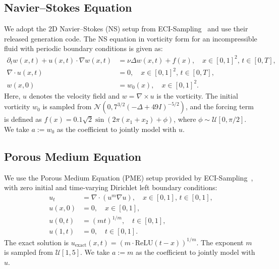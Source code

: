 \documentclass{article}
\theoremstyle{plain}
\theoremstyle{definition}
\theoremstyle{remark}
\begin{document}
\subsection{Navier--Stokes Equation}
We adopt the 2D Navier--Stokes (NS) setup from ECI-Sampling~\cite{cheng2025eci} and use their released generation code. The NS equation in vorticity form for an incompressible fluid with periodic boundary conditions is given as:
\begin{align*}
\partial_t w(x,t) + u(x,t) \cdot \nabla w(x,t) &= \nu \Delta w(x,t) + f(x), \quad x \in [0,1]^2, \, t \in [0,T], \\
\nabla \cdot u(x,t) &= 0, \quad x \in [0,1]^2, \, t \in [0,T], \\
w(x,0) &= w_0(x), \quad x \in [0,1]^2.
\end{align*}
Here, $u$ denotes the velocity field and $w = \nabla \times u$ is the vorticity. The initial vorticity $w_0$ is sampled from $\mathcal{N}(0, 7^{3/2}(-\Delta + 49I)^{-5/2})$, and the forcing term is defined as $f(x) = 0.1 \sqrt{2} \sin(2\pi(x_1 + x_2) + \phi)$, where $\phi \sim \mathcal{U}[0, \pi/2]$. We take $a:=w_0$ as the coefficient to jointly model with $u$.

\subsection{Porous Medium Equation}
We use the Porous Medium Equation (PME) setup provided by ECI-Sampling~\cite{cheng2025eci}, with zero initial and time-varying Dirichlet left boundary conditions:
\begin{align*}
u_t &= \nabla \cdot (u^m \nabla u), \quad x \in [0,1], \, t \in [0,1], \\
u(x,0) &= 0, \quad x \in [0,1], \\
u(0,t) &= (mt)^{1/m}, \quad t \in [0,1], \\
u(1,t) &= 0, \quad t \in [0,1].
\end{align*}
The exact solution is $u_{\text{exact}}(x,t) = (m \cdot \text{ReLU}(t - x))^{1/m}$. The exponent $m$ is sampled from $\mathcal{U}[1,5]$. We take $a:=m$ as the coefficient to jointly model with $u$.
\end{document}
